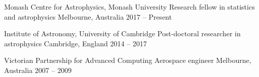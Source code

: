 

\begin{cventries}
  \cventry
    {Monash Centre for Astrophysics, Monash University}
    {Research fellow in statistics and astrophysics} 
    {Melbourne, Australia}
    {2017 -- Present}
    {}

  \cventry
    {Institute of Astronomy, University of Cambridge}
    {Post-doctoral researcher in astrophysics}
    {Cambridge, England}
    {2014 -- 2017}
    {}

  \cventry
    {Victorian Partnership for Advanced Computing}
    {Aerospace engineer}
    {Melbourne, Australia}
    {2007 -- 2009}
    {}
	
\end{cventries}
